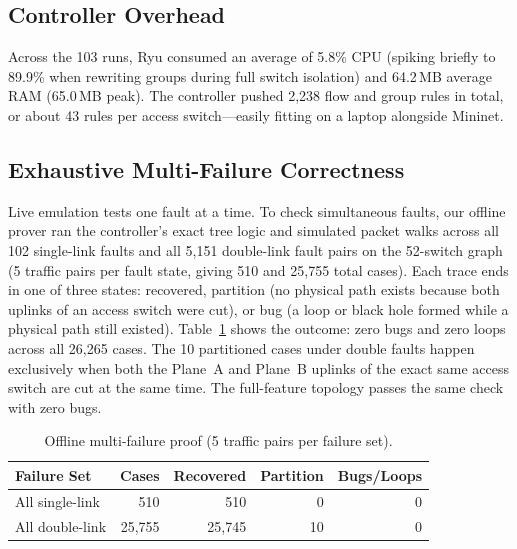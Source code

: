 \documentclass[conference]{IEEEtran}
\begin{document}
\subsection{Controller Overhead}
Across the 103 runs, Ryu consumed an average of 5.8\% CPU (spiking briefly to 89.9\% when rewriting groups during full switch isolation) and 64.2\,MB average RAM (65.0\,MB peak). The controller pushed 2{,}238 flow and group rules in total, or about 43 rules per access switch---easily fitting on a laptop alongside Mininet.

\subsection{Exhaustive Multi-Failure Correctness}
Live emulation tests one fault at a time. To check simultaneous faults, our offline prover ran the controller's exact tree logic and simulated packet walks across all 102 single-link faults and all 5{,}151 double-link fault pairs on the 52-switch graph (5 traffic pairs per fault state, giving 510 and 25{,}755 total cases). Each trace ends in one of three states: recovered, partition (no physical path exists because both uplinks of an access switch were cut), or bug (a loop or black hole formed while a physical path still existed). Table~\ref{tab:proof} shows the outcome: zero bugs and zero loops across all 26{,}265 cases. The 10 partitioned cases under double faults happen exclusively when both the Plane~A and Plane~B uplinks of the exact same access switch are cut at the same time. The full-feature topology passes the same check with zero bugs.

\begin{table}[t]
\caption{Offline multi-failure proof (5 traffic pairs per failure set).}
\label{tab:proof}
\centering
\footnotesize
\begin{tabular}{@{}lrrrr@{}}
\toprule
Failure Set & Cases & Recovered & Partition & Bugs/Loops \\
\midrule
All single-link & 510     & 510     & 0  & 0 \\
All double-link & 25{,}755 & 25{,}745 & 10 & 0 \\
\bottomrule
\end{tabular}
\end{table}
\end{document}
